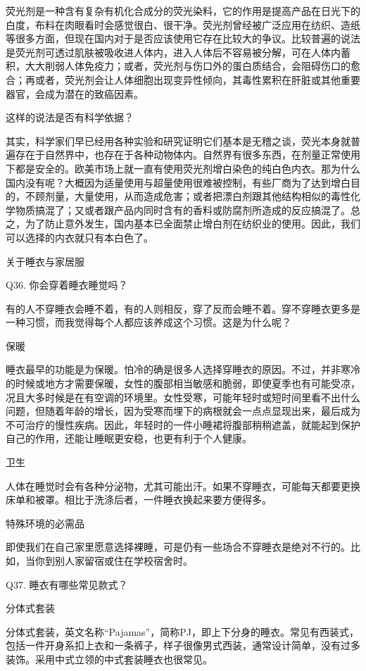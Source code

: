 \documentclass[12pt,UTF8]{ctexbook}
\begin{document}
荧光剂是一种含有复杂有机化合成分的荧光染料，它的作用是提高产品在日光下的白度，布料在肉眼看时会感觉很白、很干净。荧光剂曾经被广泛应用在纺织、造纸等很多方面，但现在国内对于是否应该使用它存在比较大的争议。比较普遍的说法是荧光剂可透过肌肤被吸收进人体内，进入人体后不容易被分解，可在人体内蓄积，大大削弱人体免疫力；或者，荧光剂与伤口外的蛋白质结合，会阻碍伤口的愈合；再或者，荧光剂会让人体细胞出现变异性倾向，其毒性累积在肝脏或其他重要器官，会成为潜在的致癌因素。

这样的说法是否有科学依据？

其实，科学家们早已经用各种实验和研究证明它们基本是无稽之谈，荧光本身就普遍存在于自然界中，也存在于各种动物体内。自然界有很多东西，在剂量正常使用下都是安全的。欧美市场上就一直有使用荧光剂增白染色的纯白色内衣。那为什么国内没有呢？大概因为适量使用与超量使用很难被控制，有些厂商为了达到增白目的，不顾剂量，大量使用，从而造成危害；或者把漂白剂跟其他结构相似的毒性化学物质搞混了；又或者跟产品内同时含有的香料或防腐剂所造成的反应搞混了。总之，为了防止意外发生，国内基本已全面禁止增白剂在纺织业的使用。因此，我们可以选择的内衣就只有本白色了。


关于睡衣与家居服


Q36. 你会穿着睡衣睡觉吗？


有的人不穿睡衣会睡不着，有的人则相反，穿了反而会睡不着。穿不穿睡衣更多是一种习惯，而我觉得每个人都应该养成这个习惯。这是为什么呢？

保暖

睡衣最早的功能是为保暖。怕冷的确是很多人选择穿睡衣的原因。不过，并非寒冷的时候或地方才需要保暖，女性的腹部相当敏感和脆弱，即使夏季也有可能受凉，况且大多时候是在有空调的环境里。女性受寒，可能年轻时或短时间里看不出什么问题，但随着年龄的增长，因为受寒而埋下的病根就会一点点显现出来，最后成为不可治疗的慢性疾病。因此，年轻时的一件小睡裙将腹部稍稍遮盖，就能起到保护自己的作用，还能让睡眠更安稳，也更有利于个人健康。

卫生

人体在睡觉时会有各种分泌物，尤其可能出汗。如果不穿睡衣，可能每天都要更换床单和被罩。相比于洗涤后者，一件睡衣换起来要方便得多。

特殊环境的必需品

即使我们在自己家里愿意选择裸睡，可是仍有一些场合不穿睡衣是绝对不行的。比如，当你到别人家留宿或住在学校宿舍时。


Q37. 睡衣有哪些常见款式？


分体式套装

分体式套装，英文名称“Pajamas”，简称PJ，即上下分身的睡衣。常见有西装式，包括一件开身系扣上衣和一条裤子，样子很像男式西装，通常设计简单，没有过多装饰。采用中式立领的中式套装睡衣也很常见。
\end{document}
